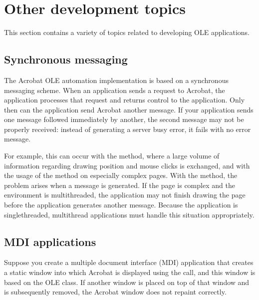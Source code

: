 \documentclass[letterpaper,12pt,english,openany,oneside]{sphinxmanual}
\begin{document}
\section{Other development topics}
\label{\detokenize{IAC_DevApp_OLE_Support:other-development-topics}}
This section contains a variety of topics related to developing OLE applications.


\subsection{Synchronous messaging}
\label{\detokenize{IAC_DevApp_OLE_Support:synchronous-messaging}}
The Acrobat OLE automation implementation is based on a synchronous messaging scheme. When an application sends a request to Acrobat, the application processes that request and returns control to the application. Only then can the application send Acrobat another message. If your application sends one message followed immediately by another, the second message may not be properly received: instead of generating a server busy error, it fails with no error message.

For example, this can occur with the  method, where a large volume of information regarding drawing position and mouse clicks is exchanged, and with the usage of the  method on especially complex pages. With the  method, the problem arises when a  message is generated. If the page is complex and the environment is multi\sphinxhyphen{}threaded, the application may not finish drawing the page before the application generates another  message. Because the application is single\sphinxhyphen{}threaded, multi\sphinxhyphen{}thread applications must handle this situation appropriately.


\subsection{MDI applications}
\label{\detokenize{IAC_DevApp_OLE_Support:mdi-applications}}
Suppose you create a multiple document interface (MDI) application that creates a static window into which Acrobat is displayed using the  call, and this window is based on the  OLE class. If another window is placed on top of that window and is subsequently removed, the Acrobat window does not repaint correctly.
\end{document}
